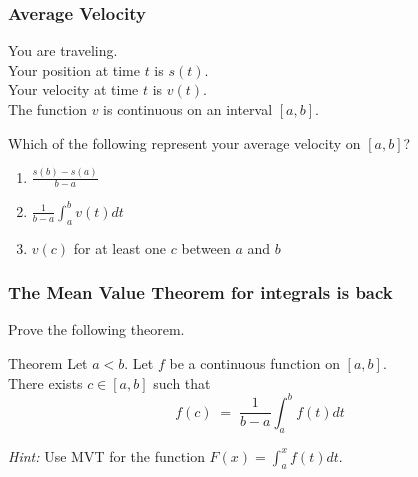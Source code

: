 \documentclass[14pt]{beamer}
\begin{document}

	\begin{frame}[t]
		\fontsize{13}{13}\selectfont
		\frametitle{Average Velocity}

		You are traveling. \\ Your position at time $t$ is $s(t)$. \\ Your velocity at
		time $t$ is $v(t)$. \\ The function $v$ is continuous on an interval $[a,b]$.

		Which of the following represent your average velocity on $[a,b]$?

		\begin{enumerate}
			\item $\displaystyle \frac{s(b) - s(a)}{b-a}$

			\item $\displaystyle \frac{1}{b-a}\int_{a}^{b}v(t) dt$

			\item $v(c)$ for at least one $c$ between $a$ and $b$
		\end{enumerate}
	\end{frame}

	\begin{frame}[t]
		\fontsize{13}{13}\selectfont
		\frametitle{The Mean Value Theorem for integrals is back}

		Prove the following theorem.

		\begin{block}{\fontsize{13}{13}\selectfont Theorem}
			Let $a < b$. Let $f$ be a continuous function on $[a,b]$. \\ There exists $c
			\in [a,b]$ such that
			\vspace{-.5cm}
			\[
				f(c) \; = \; \frac{1}{b-a}\int_{a}^{b}f(t) dt
			\]
		\end{block}


		\emph{Hint:} Use MVT for the function
		$\displaystyle F(x) = \int_{a}^{x}f(t) dt$.
	\end{frame}

\end{document}
